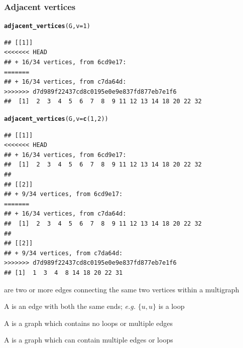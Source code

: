 \documentclass[aspectratio=169]{beamer}\usepackage[]{graphicx}\usepackage[]{xcolor}
\makeatletter
\newcommand{\hlnum}[1]{\textcolor[rgb]{0.686,0.059,0.569}{#1}}%
\newcommand{\hldef}[1]{\textcolor[rgb]{0.345,0.345,0.345}{#1}}%
\newcommand{\hlkwc}[1]{\textcolor[rgb]{0.333,0.667,0.333}{#1}}%
\newcommand{\hlkwd}[1]{\textcolor[rgb]{0.737,0.353,0.396}{\textbf{#1}}}%
\newenvironment{kframe}{%
 \def\at@end@of@kframe{}%
 \ifinner\ifhmode%
  \def\at@end@of@kframe{\end{minipage}}%
  \begin{minipage}{\columnwidth}%
 \fi\fi%
 \def\FrameCommand##1{\hskip\@totalleftmargin \hskip-\fboxsep
 \colorbox{shadecolor}{##1}\hskip-\fboxsep
     \hskip-\linewidth \hskip-\@totalleftmargin \hskip\columnwidth}%
 \MakeFramed {\advance\hsize-\width
   \@totalleftmargin\z@ \linewidth\hsize
   \@setminipage}}%
 {\par\unskip\endMakeFramed%
 \at@end@of@kframe}
\newenvironment{knitrout}{}{} %
\makeatother
\begin{document}
\begin{frame}[fragile]\frametitle{Adjacent vertices}
\begin{knitrout}
\color{fgcolor}\begin{kframe}
\begin{alltt}
\hlkwd{adjacent_vertices}\hldef{(G,} \hlkwc{v} \hldef{=} \hlnum{1}\hldef{)}
\end{alltt}
\begin{verbatim}
## [[1]]
<<<<<<< HEAD
## + 16/34 vertices, from 6cd9e17:
=======
## + 16/34 vertices, from c7da64d:
>>>>>>> d7d989f22437cd8c0195e0e9e837fd877eb7e1f6
##  [1]  2  3  4  5  6  7  8  9 11 12 13 14 18 20 22 32
\end{verbatim}
\begin{alltt}
\hlkwd{adjacent_vertices}\hldef{(G,} \hlkwc{v} \hldef{=} \hlkwd{c}\hldef{(}\hlnum{1}\hldef{,} \hlnum{2}\hldef{))}
\end{alltt}
\begin{verbatim}
## [[1]]
<<<<<<< HEAD
## + 16/34 vertices, from 6cd9e17:
##  [1]  2  3  4  5  6  7  8  9 11 12 13 14 18 20 22 32
## 
## [[2]]
## + 9/34 vertices, from 6cd9e17:
=======
## + 16/34 vertices, from c7da64d:
##  [1]  2  3  4  5  6  7  8  9 11 12 13 14 18 20 22 32
## 
## [[2]]
## + 9/34 vertices, from c7da64d:
>>>>>>> d7d989f22437cd8c0195e0e9e837fd877eb7e1f6
## [1]  1  3  4  8 14 18 20 22 31
\end{verbatim}
\end{kframe}
\end{knitrout}
\end{frame}


\begin{frame}
	\begin{definition}
	 are two or more edges connecting the same two vertices within a multigraph
	\end{definition}
	\vfill
	\begin{definition}[Loop]
	A  is an edge with both the same ends; \emph{e.g.} $\{u,u\}$ is a loop
	\end{definition}
	\vfill
	\begin{definition}
		A  is a graph which contains no loops or multiple edges
	\end{definition}
	\vfill
	\begin{definition}[Multigraph]
		A  is a graph which can contain multiple edges or loops
	\end{definition}
\end{frame}
\end{document}
